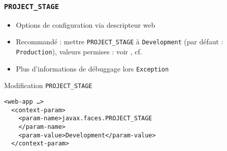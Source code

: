 \documentclass[english, french]{beamer}
\begin{document}
\begin{frame}[fragile]
	\frametitle{\texttt{PROJECT\_STAGE}}
	\begin{itemize}
		\item Options de configuration via descripteur web
		\item Recommandé : mettre \texttt{PROJECT\_STAGE} à \texttt{Development} {\tiny (par défaut : \texttt{Production}), valeurs permises : voir , cf. }%
		\item Plus d’informations de débuggage lors \texttt{Exception}
	\end{itemize}
	\begin{exampleblock}{Modification \texttt{PROJECT\_STAGE}}
		\begin{lstlisting}
<web-app …>
  <context-param>
    <param-name>javax.faces.PROJECT_STAGE
    </param-name>
    <param-value>Development</param-value>
  </context-param>
		\end{lstlisting}
	\end{exampleblock}
\end{frame}
\end{document}
